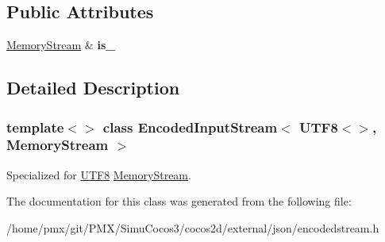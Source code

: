 \subsection*{Public Attributes}
\begin{DoxyCompactItemize}
\item 
\mbox{\label{classEncodedInputStream_3_01UTF8_3_4_00_01MemoryStream_01_4_ad5e48564bbd14297a4cc445af3a4aa83}} 
\hyperlink{structMemoryStream}{Memory\+Stream} \& {\bfseries is\+\_\+}
\end{DoxyCompactItemize}


\subsection{Detailed Description}
\subsubsection*{template$<$$>$\newline
class Encoded\+Input\+Stream$<$ U\+T\+F8$<$$>$, Memory\+Stream $>$}

Specialized for \hyperlink{structUTF8}{U\+T\+F8} \hyperlink{structMemoryStream}{Memory\+Stream}. 

The documentation for this class was generated from the following file\+:\begin{DoxyCompactItemize}
\item 
/home/pmx/git/\+P\+M\+X/\+Simu\+Cocos3/cocos2d/external/json/encodedstream.\+h\end{DoxyCompactItemize}
